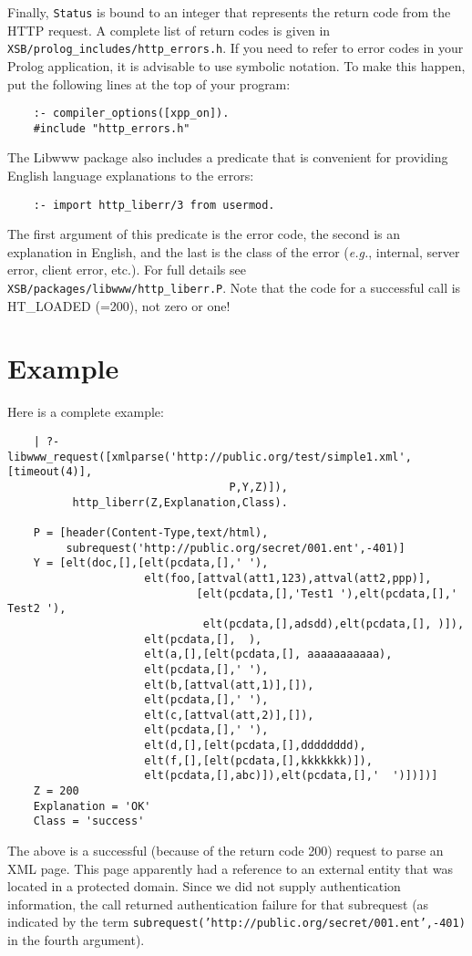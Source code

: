 Finally, {\tt Status} is bound to an integer that represents the return
code from the HTTP request. A complete list of return codes is given in
{\tt XSB/prolog\_includes/http\_errors.h}. If you need to refer to error
codes in your Prolog application, it is advisable to use symbolic
notation. To make this happen, put the following lines at the top of your
program: 
\begin{verbatim}
    :- compiler_options([xpp_on]).
    #include "http_errors.h"
\end{verbatim}
The Libwww package also includes a predicate that is convenient for
providing English language explanations to the errors:
\begin{verbatim}
    :- import http_liberr/3 from usermod.  
\end{verbatim}
The first argument of this predicate is the error code, the second is an
explanation in English, and the last is the class of the error ({\it e.g.},
internal, server error, client error, etc.). For full details see
{\tt XSB/packages/libwww/http\_liberr.P}. Note that the code for a successful 
call is HT\_LOADED (=200), not zero or one!

\section{Example}

Here is a complete example:
\begin{verbatim}
    | ?- libwww_request([xmlparse('http://public.org/test/simple1.xml',[timeout(4)],
                                  P,Y,Z)]),
          http_liberr(Z,Explanation,Class).

    P = [header(Content-Type,text/html),
         subrequest('http://public.org/secret/001.ent',-401)]
    Y = [elt(doc,[],[elt(pcdata,[],' '),
                     elt(foo,[attval(att1,123),attval(att2,ppp)],
                             [elt(pcdata,[],'Test1 '),elt(pcdata,[],' Test2 '),
                              elt(pcdata,[],adsdd),elt(pcdata,[], )]),
                     elt(pcdata,[],  ),
                     elt(a,[],[elt(pcdata,[], aaaaaaaaaaa),
                     elt(pcdata,[],' '),
                     elt(b,[attval(att,1)],[]),
                     elt(pcdata,[],' '),
                     elt(c,[attval(att,2)],[]),
                     elt(pcdata,[],' '),
                     elt(d,[],[elt(pcdata,[],dddddddd),
                     elt(f,[],[elt(pcdata,[],kkkkkkk)]),
                     elt(pcdata,[],abc)]),elt(pcdata,[],'  ')])])]
    Z = 200
    Explanation = 'OK'
    Class = 'success'
\end{verbatim}
The above is a successful (because of the return code 200) request to parse
an XML page. This page apparently had a reference to an external entity
that was located in a protected domain. Since we did not supply
authentication information, the call returned authentication failure for
that subrequest (as indicated by the term 
{\tt subrequest('http://public.org/secret/001.ent',-401)} in the fourth
argument).

